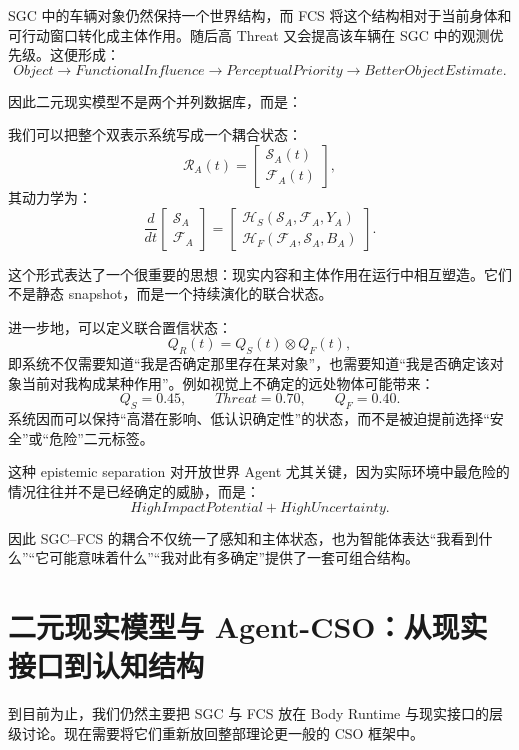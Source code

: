 SGC 中的车辆对象仍然保持一个世界结构，而 FCS 将这个结构相对于当前身体和可行动窗口转化成主体作用。随后高 Threat 又会提高该车辆在 SGC 中的观测优先级。这便形成：
\[
Object
\rightarrow
FunctionalInfluence
\rightarrow
PerceptualPriority
\rightarrow
BetterObjectEstimate.
\]

因此二元现实模型不是两个并列数据库，而是：
\begin{statementbox}
\centering
{}
\end{statementbox}

我们可以把整个双表示系统写成一个耦合状态：
\[
\mathcal R_A(t)
=
\begin{bmatrix}
\mathcal S_A(t)\\
\mathcal F_A(t)
\end{bmatrix},
\]
其动力学为：
\[
\frac{d}{dt}
\begin{bmatrix}
\mathcal S_A\\
\mathcal F_A
\end{bmatrix}
=
\begin{bmatrix}
\mathcal H_S(\mathcal S_A,\mathcal F_A,Y_A)\\
\mathcal H_F(\mathcal F_A,\mathcal S_A,B_A)
\end{bmatrix}.
\]

这个形式表达了一个很重要的思想：现实内容和主体作用在运行中相互塑造。它们不是静态 snapshot，而是一个持续演化的联合状态。

进一步地，可以定义联合置信状态：
\[
Q_R(t)
=
Q_S(t)\otimes Q_F(t),
\]
即系统不仅需要知道“我是否确定那里存在某对象”，也需要知道“我是否确定该对象当前对我构成某种作用”。例如视觉上不确定的远处物体可能带来：
\[
Q_S=0.45,\qquad Threat=0.70,\qquad Q_F=0.40.
\]
系统因而可以保持“高潜在影响、低认识确定性”的状态，而不是被迫提前选择“安全”或“危险”二元标签。

这种 epistemic separation 对开放世界 Agent 尤其关键，因为实际环境中最危险的情况往往并不是已经确定的威胁，而是：
\[
HighImpactPotential
+
HighUncertainty.
\]

因此 SGC--FCS 的耦合不仅统一了感知和主体状态，也为智能体表达“我看到什么”“它可能意味着什么”“我对此有多确定”提供了一套可组合结构。


\section{二元现实模型与 Agent-CSO：从现实接口到认知结构}

到目前为止，我们仍然主要把 SGC 与 FCS 放在 Body Runtime 与现实接口的层级讨论。现在需要将它们重新放回整部理论更一般的 CSO 框架中。

